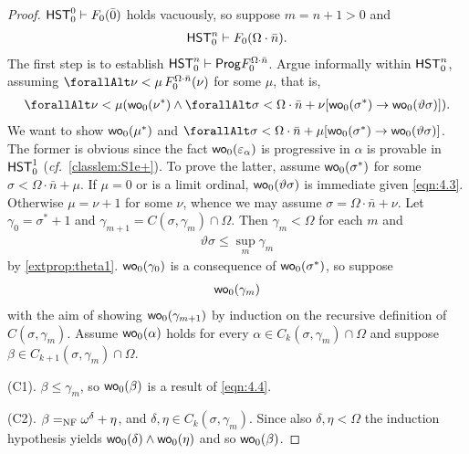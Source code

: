 \documentclass[UKenglish,cleveref,DIV=12]{scrartcl}
\let\forall\forallAlt
\theoremstyle{definition}
\theoremstyle{definition}
\begin{document}
\begin{proof}
$\mathsf{HST}_0^0\vdash F_0(\bar0)$ holds vacuously, so suppose $m=n+1>0$ and
\begin{align}\label{eqn:4.1}
\mathsf{HST}_0^n\vdash F_0(\Omega\cdot\bar n).
\end{align}
The first step is to establish
  $\mathsf{HST}_0^n\vdash\mathsf{Prog} F^{\Omega\cdot\bar n}_0$.
Argue informally within $\mathsf{HST}_0^n$, assuming $\forall\nu<\mu\, F_0^{\Omega\cdot\bar n}(\nu)$ for some $\mu$, that is,
\begin{gather}\label{eqn:4.3}
  \forall\nu<\mu(\wo_0(\nu^*)\land\forall\sigma<\Omega\cdot\bar n+\nu[\wo_0(\sigma^*)\rightarrow\wo_0(\vartheta\sigma)]).
\end{gather}
We want to show $\mathsf{wo}_0(\mu^*)$ and $\forall\sigma<\Omega\cdot\bar n+\mu[\wo_0(\sigma^*)\rightarrow\wo_0(\vartheta\sigma)]$. The former is obvious since the fact $\mathsf{wo}_0(\varepsilon_\alpha)$ is progressive in $\alpha$ is provable in $\mathsf{HST}_0^1$ ({\em cf.}~\cref{classlem:S1e+}). To prove the latter, assume $\mathsf{wo}_0(\sigma^*)$ for some $\sigma<\Omega\cdot\bar n+\mu$. If $\mu=0$ or is
a limit ordinal, $\mathsf{wo}_0(\vartheta\sigma)$ is immediate given \cref{eqn:4.3}. Otherwise $\mu=\nu+1$
for some $\nu$, whence we may assume $\sigma=\Omega\cdot\bar n+\nu$. Let
$\gamma_0=\sigma^*+1$ and $\gamma_{m+1}=C(\sigma,\gamma_m)\cap\Omega$. Then
$\gamma_m<\Omega$ for each $m$ and
\begin{align*}
  \vartheta \sigma\le\sup_{m}\gamma_m
\end{align*}
by \cref{extprop:theta1}. $\mathsf{wo}_0(\gamma_0)$ is a consequence of
$\mathsf{wo}_0(\sigma^*)$, so suppose
\begin{align}\label{eqn:4.4}
 \mathsf{wo}_0(\gamma_m)
\end{align}
with the aim of showing $\mathsf{wo}_0(\gamma_{m+1})$ by induction on the recursive
definition of $C(\sigma,\gamma_m)$. Assume $\mathsf{wo}_0(\alpha)$ holds for every
$\alpha\in C_{k}(\sigma,\gamma_m)\cap\Omega$ and suppose $\beta\in
C_{k+1}(\sigma,\gamma_m)\cap\Omega$.

(C1). $\beta\le\gamma_m$, so $\mathsf{wo}_0(\beta)$ is a result of \cref{eqn:4.4}.

(C2). $\beta=_{\mathrm{NF}}\omega^\delta+\eta$, and $\delta,\eta\in C_k(\sigma,\gamma_m)$.
Since also $\delta,\eta<\Omega$ the induction hypothesis yields
$\mathsf{wo}_0(\delta)\land\mathsf{wo}_0(\eta)$ and so $\mathsf{wo}_0(\beta)$.


\end{proof}
\end{document}
